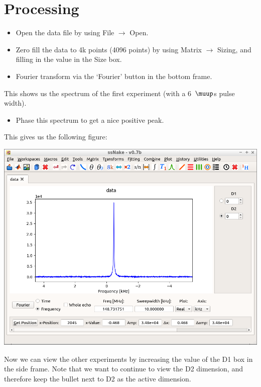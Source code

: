 \documentclass[11pt,a4paper]{article}
\begin{document}
\section{Processing}
\begin{itemize}
\item Open the data file by using File $\longrightarrow$ Open.
\item Zero fill the data to 4k points (4096 points) by using Matrix $\longrightarrow$ Sizing, and filling in the value in the Size box.
\item Fourier transform via the `Fourier' button in the bottom frame.
\end{itemize}
This shows us the spectrum of the first experiment (with a 6~$\muup$s pulse width).
\begin{itemize}
\item Phase this spectrum to get a nice positive peak.
\end{itemize}
This gives us the following figure:

\begin{center}
\includegraphics[width=0.8\linewidth]{Figs/Fig1.png}
\end{center}


Now we can view the other experiments by increasing the value of the D1 box in the side frame. Note that we want to continue to view the D2 dimension, and therefore keep the bullet next to D2 as the active dimension.
\end{document}
